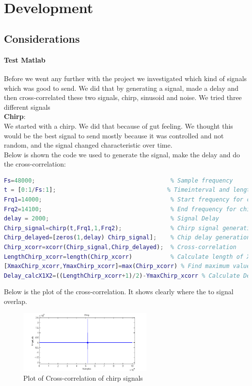 \chapter{Development}
\section{Considerations}

\subsubsection{Test Matlab}
Before we went any further with the project we investigated which kind of signals which was good to send. We did that by generating a signal, made a delay and then cross-correlated these two signals, chirp, sinusoid and noise.
We tried three different signals\\
\textbf{Chirp}:\\
We started with a chirp. We did that because of gut feeling. We thought this would be the best signal to send mostly because it was controlled and not random, and the signal changed characteristic over time.\\
Below is shown the code we used to generate the signal, make the delay and do the cross-correlation:
\begin{lstlisting}[language=Matlab,frame=lrtb,label=Matlab Code for Chirp Cross-correlation]
Fs=48000;                                       % Sample frequency
t = [0:1/Fs:1];                                % Timeinterval and length
Frq1=14000;                                     % Start frequency for chirp
Frq2=14100;                                     % End frequency for chirp
delay = 2000;                                   % Signal Delay
Chirp_signal=chirp(t,Frq1,1,Frq2);              % Chirp signal generation
Chirp_delayed=[zeros(1,delay) Chirp_signal];    % Chip delay generation
Chirp_xcorr=xcorr(Chirp_signal,Chirp_delayed);  % Cross-correlation
LengthChirp_xcorr=length(Chirp_xcorr)           % Calculate length of Xcorr
[XmaxChirp_xcorr,YmaxChirp_xcorr]=max(Chirp_xcorr) % Find maximum value
Delay_calcX1X2=((LengthChirp_xcorr+1)/2)-YmaxChirp_xcorr % Calculate Delay
\end{lstlisting}
Below is the plot of the cross-correlation. It shows clearly where the to signal overlap.\\
\begin{figure}[H]
\centering
\includegraphics[width=0.6\textwidth]{billeder/chirp_xcorr_fig}
\caption{Plot of Cross-correlation of chirp signals}
\label{fig:chirp_xcorr_plot}
\end{figure}
